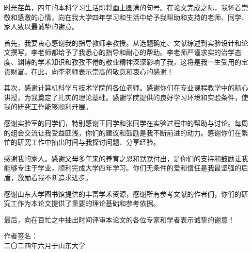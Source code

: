 
    时光荏苒，四年的本科学习生活即将画上圆满的句号。在论文完成之际，我怀着崇敬和感激的心情，向在我大学四年学习和生活中给予我帮助和支持的老师、同学、家人致以最诚挚的谢意。

    首先，我要衷心感谢我的指导教师李教授。从选题确定、文献综述到实验设计和论文撰写，李老师都给予了我悉心的指导和耐心的帮助。李老师严谨求实的治学态度、渊博的学术知识和孜孜不倦的敬业精神深深影响了我，这将是我一生受用的宝贵财富。在此，向李老师表示崇高的敬意和衷心的感谢！

    其次，感谢计算机科学与技术学院的各位老师。感谢你们在专业课程教学中的精心讲授，为我奠定了扎实的理论基础。感谢学院提供的良好学习环境和实验条件，使我的研究工作能够顺利开展。

    感谢实验室的同学们，特别感谢王同学和张同学在实验过程中的帮助与讨论。每周的组会交流让我受益匪浅，你们的建议和鼓励是我不断前进的动力。感谢你们在繁忙的研究工作中抽出时间与我探讨问题、分享经验。

    感谢我的家人。感谢父母多年来的养育之恩和默默付出，是你们的支持和鼓励让我能够专注于学业，顺利完成大学四年学习。你们无条件的爱和信任是我最坚强的后盾，激励着我不断追求进步。

    感谢山东大学图书馆提供的丰富学术资源，感谢所有参考文献的作者们，你们的研究工作为本论文提供了重要的理论基础和参考依据。

    最后，向在百忙之中抽出时间评审本论文的各位专家和学者表示诚挚的谢意！

    \vspace{2cm}
    \begin{flushright}
        作者签名：\underline{\hspace{3cm}}\\
        \vspace{0.5cm}
        二〇二四年六月于山东大学
    \end{flushright}
